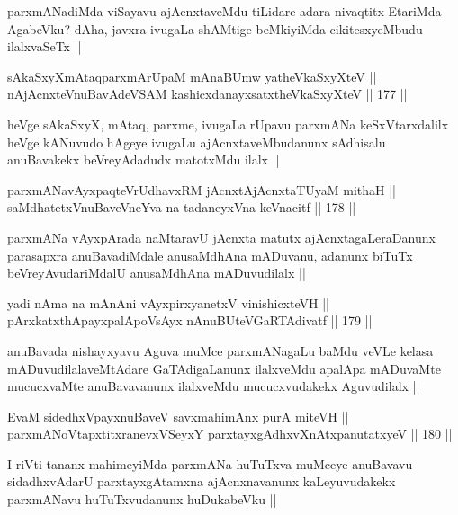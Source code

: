 \begin{artha}
parxmANadiMda viSayavu ajAcnxtaveMdu tiLidare adara nivaqtitx EtariMda AgabeVku? dAha, javxra ivugaLa shAMtige beMkiyiMda cikitesxyeMbudu ilalxvaSeTx ||
\end{artha}

\begin{shl}
sAkaSxyXmAtaqparxmArUpaM mAnaBUmw yatheVkaSxyXteV || \\
nAjAcnxteV\s nuBavAdeVSAM kashicxdanayxsatxtheVkaSxyXteV ||  177 ||  
\end{shl}

\begin{artha}
heVge sAkaSxyX, mAtaq, parxme, ivugaLa rUpavu parxmANa keSxVtarxdalilx heVge kANuvudo hAgeye ivugaLu ajAcnxtaveMbudanunx sAdhisalu anuBavakekx beVreyAdadudx matotxMdu ilalx ||
\end{artha}

\begin{shl}
parxmANavAyxpaqteVrUdhavxRM jAcnxtAjAcnxtaTUyaM mithaH || \\
saMdhatetxV\s nuBaveVneYva na tadaneyxVna keVnacitf ||  178 ||  
\end{shl}

\begin{artha}
parxmANa vAyxpArada naMtaravU jAcnxta matutx ajAcnxtagaLeraDanunx parasapxra anuBavadiMdale anusaMdhAna mADuvanu, adanunx biTuTx beVreyAvudariMdalU anusaMdhAna mADuvudilalx ||
\end{artha}

\begin{shl}
yadi nAma na mAnAni vAyxpirxyanetxV vinishicxteVH || \\
pArxkatxthA\s payxpalApoV\s sAyx nAnuBUteVGaRTAdivatf ||  179 ||  
\end{shl}

\begin{artha}
anuBavada nishayxyavu Aguva muMce parxmANagaLu baMdu veVLe kelasa mADuvudilalaveMtAdare GaTAdigaLanunx ilalxveMdu apalApa mADuvaMte mucucxvaMte anuBavavanunx ilalxveMdu mucucxvudakekx Aguvudilalx ||
\end{artha}

\begin{shl}
EvaM sidedhxV\s payxnuBaveV savxmahimAnx purA miteVH ||  \\
parxmANoVtapxtitxranevxVSeyxY parxtayxgAdhxvXnAtxpanutatxyeV ||  180 ||  
\end{shl}

\begin{artha}
I riVti tananx mahimeyiMda parxmANa huTuTxva muMceye anuBavavu sidadhxvAdarU parxtayxgAtamxna ajAcnxnavanunx kaLeyuvudakekx parxmANavu huTuTxvudanunx huDukabeVku ||
\end{artha}

